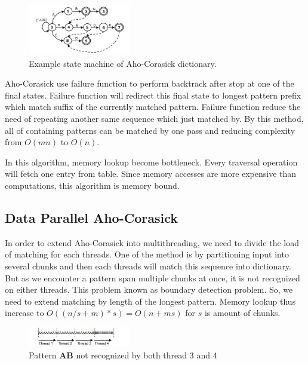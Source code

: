 \documentclass[conference]{IEEEtran}
\begin{document}
    \begin{figure}[htbp]
        \centerline{\includegraphics[width=0.4\textwidth]{../src/resources/aho-c.png}}
        \caption{Example state machine of Aho-Corasick dictionary.}
        \label{fig}
    \end{figure}

    Aho-Corasick use failure function to perform backtrack after stop at one of the final states. Failure function will redirect this final state to longest pattern prefix which match suffix of the currently matched pattern. Failure function reduce the need of repeating another same sequence which just matched by. By this method, all of containing patterns can be matched by one pass and reducing complexity from $O(mn)$ to $O(n)$. 

    In this algorithm, memory lookup become bottleneck. Every traversal operation will fetch one entry from table. Since memory accesses are more expensive than computations, this algorithm is memory bound.

    \subsection{Data Parallel Aho-Corasick}
    In order to extend Aho-Corasick into multithreading, we need to divide the load of matching for each threads. One of the method is by partitioning input into several chunks and then each threads will match this sequence into dictionary. But as we encounter a pattern span multiple chunks at once, it is not recognized on either threads. This problem known as boundary detection problem. So, we need to extend matching by length of the longest pattern. Memory lookup thus increase to $O((n/s + m) * s) = O(n + ms)$ for $s$ is amount of chunks. 

    \begin{figure}[htbp]
        \centerline{\includegraphics[width=0.4\textwidth]{../src/resources/boundary.png}}
        \caption{Pattern \textbf{AB} not recognized by both thread 3 and 4}
        \label{fig}
    \end{figure}
\end{document}
